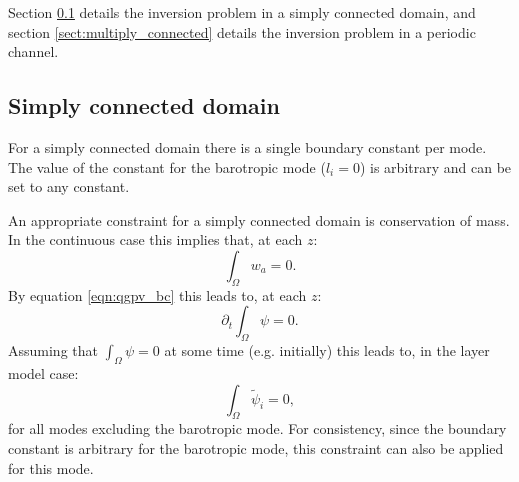 \documentclass[a4paper]{book}
\begin{document}
Section \ref{sect:simply_connected} details the
inversion problem in a simply connected domain, and section
\ref{sect:multiply_connected} details the inversion problem in a periodic
channel.

\subsection{Simply connected domain}\label{sect:simply_connected}

For a simply connected domain there is a single boundary constant per
mode. The value of the constant for the barotropic mode ($l_i = 0$) is arbitrary \linebreak
\citep{mcwilliams1977} and can be set to any constant.

An appropriate constraint for a simply connected domain is conservation of mass.
In the continuous case this implies that, at each $z$:
\begin{equation}
  \int_\Omega w_a = 0.
\end{equation}
By equation \eqref{eqn:qgpv_bc} this leads to, at each $z$:
\begin{equation}
  \partial_t \int_\Omega \psi = 0.
\end{equation}
Assuming that $\int_\Omega \psi = 0$ at some time (e.g. initially) this leads
to, in the layer model case:
\begin{equation}\label{eqn:mass_conservation}
  \int_\Omega \tilde{\psi}_i = 0,
\end{equation}
for all modes excluding the barotropic mode. For consistency, since the boundary
constant is arbitrary for the barotropic mode, this constraint can also be
applied for this mode.
\end{document}
